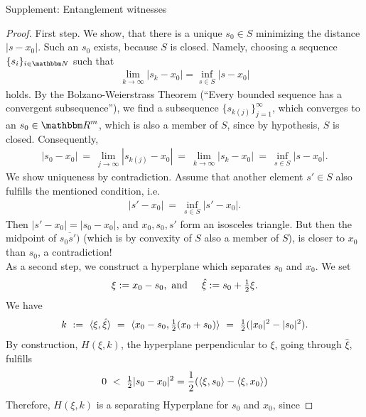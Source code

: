 \begin{section}{Supplement: Entanglement witnesses}
     \begin{proof}
      First step. We show, that there is a unique $s_0 \in S$ minimizing the distance $|s-x_0|$. Such an $s_0$ exists, because $S$ is closed. Namely, choosing a sequence $\{s_i\}_{i \in \bbmN}$ such that 
      \begin{align}
       \underset{k \rightarrow \infty}{\lim}|s_k - x_0| = \underset{s \in S}{\inf}|s - x_0|
      \end{align}
      holds. By the Bolzano-Weierstrass Theorem (``Every bounded sequence has a convergent subsequence''), we find a subsequence $\{s_{k(j)}\}_{j=1}^\infty$, which converges to an $s_0 \in \bbmR^m$, which is 
      also a member of $S$, since by hypothesis, $S$ is closed. Consequently,
      \begin{align}
       |s_0 - x_0| \ = \ \underset{j \rightarrow \infty}{\lim} |s_{k(j)} - x_0| \ = \ \underset{k \rightarrow \infty}{\lim} |s_k - x_0| \ = \ \underset{s \in S}{\inf} |s -x_0|.
      \end{align}
      We show uniqueness by contradiction. Assume that another element $s' \in S$ also fulfills the mentioned condition, i.e.   
      \begin{align}
       |s' - x_0|  \ = \ \underset{s \in S}{\inf} |s' - x_0|. 
      \end{align}
      Then $|s' - x_0| = |s_0 - x_0|$, and $x_0, s_0, s'$ form an isosceles triangle. But then the midpoint of $\overline{s_0s')}$ (which is by convexity of $S$ also a member of $S$), is closer to $x_0$ than $s_0$, a 
      contradiction! \\
      As a second step, we construct a hyperplane which separates $s_0$ and $x_0$. We set
      \begin{align}
       \xi := x_0 - s_0, \ \text{and} \hspace{.5cm} \hat{\xi} := s_0 + \tfrac{1}{2} \xi.
      \end{align}
      We have
      \begin{align}
       k \ := \ \braket{\xi,\hat{\xi}} \ = \ \braket{x_0 - s_0, \tfrac{1}{2}(x_0 + s_0)} \ = \ \tfrac{1}{2}(|x_0|^2 - |s_0|^2).
      \end{align}
      By construction, $H(\xi, k)$, the hyperplane perpendicular to $\xi$, going through $\hat{\xi}$, fulfills
      \begin{align}
       0 \ < \ \tfrac{1}{2} |s_0 - x_0|^2 = \frac{1}{2}(\braket{\xi,s_0} - \braket{\xi,x_0})
      \end{align}
      Therefore, $H(\xi, k)$ is a separating Hyperplane for $s_0$ and $x_0$, since

\end{proof}
\end{section}

